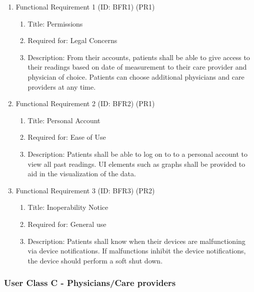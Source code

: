 \documentclass[12pt]{article}
\begin{document}
\begin{enumerate}
    \item Functional Requirement 1 (ID: BFR1) (PR1)
    \begin{enumerate}
        \item Title: Permissions
        \item Required for: Legal Concerns
        \item Description: From their accounts, patients shall be able to give access to their readings based on
        date of measurement to their care provider and physician of choice. Patients can choose additional physicians
        and care providers at any time.
    \end{enumerate}
    \item Functional Requirement 2 (ID: BFR2) (PR1)
    \begin{enumerate}
        \item Title: Personal Account
        \item Required for: Ease of Use
        \item Description: Patients shall be able to log on to to a personal account to view all past readings.
        UI elements such as graphs shall be provided to aid in the visualization of the data.
    \end{enumerate}
    \item Functional Requirement 3 (ID: BFR3) (PR2)
    \begin{enumerate}
        \item Title: Inoperability Notice
        \item Required for: General use
        \item Description: Patients shall know when their devices are malfunctioning via device notifications.
        If malfunctions inhibit the device notifications, the device should perform a soft shut down.
    \end{enumerate}
\end{enumerate}

\subsubsection{User Class C - Physicians/Care providers}
\end{document}
